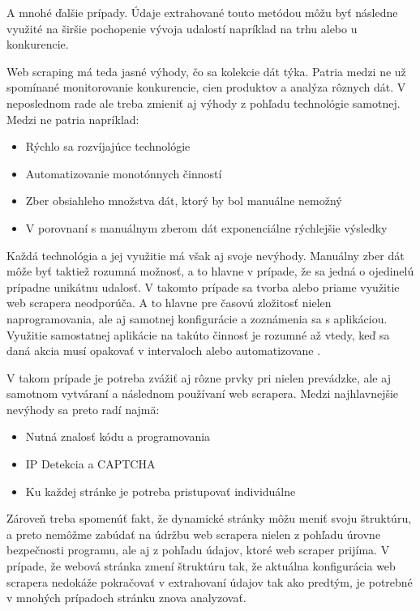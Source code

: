 A mnohé ďalšie prípady. Údaje extrahované touto metódou môžu byť následne využité na širšie pochopenie vývoja udalostí napríklad na trhu alebo u konkurencie.

Web scraping má teda jasné výhody, čo sa kolekcie dát týka. Patria medzi ne už spomínané monitorovanie konkurencie, cien produktov a analýza rôznych dát. V neposlednom rade ale treba zmieniť aj výhody z pohľadu technológie samotnej. Medzi ne patria napríklad:

\begin{itemize}
    \item {Rýchlo sa rozvíjajúce technológie}
    \item {Automatizovanie monotónnych činností}
    \item {Zber obsiahleho množstva dát, ktorý by bol manuálne nemožný}
    \item {V porovnaní s manuálnym zberom dát exponenciálne rýchlejšie výsledky}
\end{itemize}

Každá technológia a jej využitie má však aj svoje nevýhody. Manuálny zber dát môže byť taktiež rozumná možnosť, a to hlavne v prípade, že sa jedná o ojedinelú prípadne unikátnu udalosť. V takomto prípade sa tvorba alebo priame využitie web scrapera neodporúča. A to hlavne pre časovú zložitosť nielen naprogramovania, ale aj samotnej konfigurácie a zoznámenia sa s aplikáciou. Využitie samostatnej aplikácie na takúto činnosť je rozumné až vtedy, keď sa daná akcia musí opakovať v intervaloch alebo automatizovane \cite{WebScrap}. 

V takom prípade je potreba zvážiť aj rôzne prvky pri nielen prevádzke, ale aj samotnom vytváraní a následnom používaní web scrapera. Medzi najhlavnejšie nevýhody sa preto radí najmä:

\begin{itemize}
    \item {Nutná znalosť kódu a programovania}
    \item {IP Detekcia a CAPTCHA}
    \item {Ku každej stránke je potreba pristupovať individuálne}
\end{itemize}

Zároveň treba spomenúť fakt, že dynamické stránky môžu meniť svoju štruktúru, a preto nemôžme zabúdať na údržbu web scrapera nielen z pohľadu úrovne bezpečnosti programu, ale aj z pohľadu údajov, ktoré web scraper prijíma. V prípade, že webová stránka zmení štruktúru tak, že aktuálna konfigurácia web scrapera nedokáže pokračovať v extrahovaní údajov tak ako predtým, je potrebné v mnohých prípadoch stránku znova analyzovať. 

